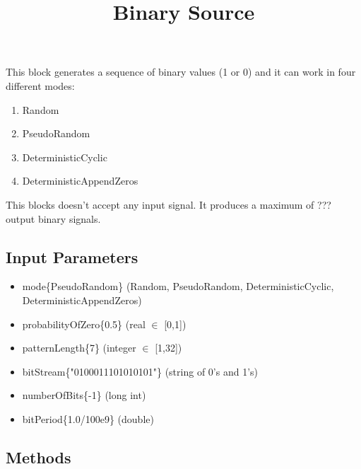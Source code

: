 \documentclass[a4paper]{article}
\title{Binary Source}
\begin{document}
\maketitle
This block generates a sequence of binary values (1 or 0) and it can work in four different modes: 

\begin{multicols}{2}
\begin{enumerate}
	\item Random
	\item PseudoRandom 
	\item DeterministicCyclic 
	\item DeterministicAppendZeros 
\end{enumerate}
\end{multicols}

This blocks doesn't accept any input signal. It produces a maximum of ??? output binary signals.

\subsection*{Input Parameters}

	\begin{itemize}
		\item mode\{PseudoRandom\}\linebreak
		(Random, PseudoRandom, DeterministicCyclic, DeterministicAppendZeros)
		\item probabilityOfZero\{0.5\}\linebreak
		(real $\in$ [0,1])
		\item patternLength\{7\} \linebreak
		(integer $\in$ [1,32]) 
		\item bitStream\{"0100011101010101"\} \linebreak
		(string of 0's and 1's)
		\item numberOfBits\{-1\} \linebreak
		(long int)
		\item bitPeriod\{1.0/100e9\} \linebreak
		(double)
	\end{itemize}

\subsection*{Methods}
\end{document}
